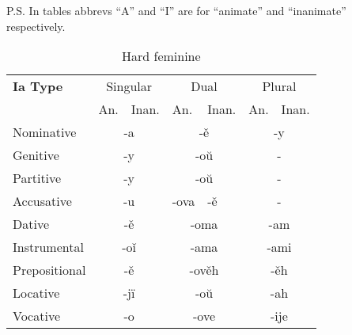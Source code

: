 P.S. In tables abbrevs “A” and “I” are for “animate” and “inanimate” respectively.


\begin{table}[!htb]
	\caption{Hard feminine}
	\begin{tabular}{lllllll}
		\textbf{Ia Type}       
			& \multicolumn{2}{c}{Singular} 
				& \multicolumn{2}{c}{Dual} 
					& \multicolumn{2}{c}{Plural} \\
		& An.   & Inan.  & An.   & Inan.   & An.  & Inan. \\
		Nominative    & \multicolumn{2}{c}{-a}      
						& \multicolumn{2}{c}{-ě}        
							& \multicolumn{2}{c}{-y} \\
		Genitive      & \multicolumn{2}{c}{-y}       
						& \multicolumn{2}{c}{-oŭ}      
							& \multicolumn{2}{c}{-}   \\
		Partitive     & \multicolumn{2}{c}{-y}       
						& \multicolumn{2}{c}{-oŭ}      
							& \multicolumn{2}{c}{-} \\
		Accusative    & \multicolumn{2}{c}{-u}       
						& -ova & -ě
							& \multicolumn{2}{c}{-} \\
		Dative        & \multicolumn{2}{c}{-ě}       
						& \multicolumn{2}{c}{-oma}     
							& \multicolumn{2}{c}{-am} \\
		Instrumental  & \multicolumn{2}{c}{-oǐ}     
						 & \multicolumn{2}{c}{-ama}     
						 	& \multicolumn{2}{c}{-ami} \\
		Prepositional & \multicolumn{2}{c}{-ě}       
						& \multicolumn{2}{c}{-ověh}     
							& \multicolumn{2}{c}{-ěh} \\
		Locative      & \multicolumn{2}{c}{-jï}      
						& \multicolumn{2}{c}{-oŭ}       
							& \multicolumn{2}{c}{-ah} \\ 
		Vocative      & \multicolumn{2}{c}{-o}       
						& \multicolumn{2}{c}{-ove}      
							& \multicolumn{2}{c}{-ije}
	\end{tabular}
\end{table}


